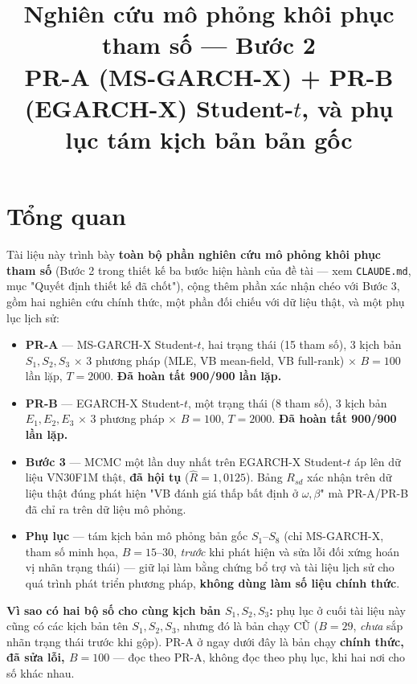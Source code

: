 \documentclass[11pt,a4paper]{article}
\title{\vspace{-1.2cm}\textbf{Nghiên cứu mô phỏng khôi phục tham số --- Bước 2}\\[0.25em]
\large PR-A (MS-GARCH-X) + PR-B (EGARCH-X) Student-$t$, và phụ lục tám kịch bản bản gốc}
\author{}
\date{}
\begin{document}
\maketitle
\vspace{-1.4cm}

\section*{Tổng quan}
Tài liệu này trình bày \textbf{toàn bộ phần nghiên cứu mô phỏng khôi phục tham số}
(Bước 2 trong thiết kế ba bước hiện hành của đề tài --- xem \texttt{CLAUDE.md},
mục "Quyết định thiết kế đã chốt"), cộng thêm phần xác nhận chéo với Bước 3,
gồm hai nghiên cứu chính thức, một phần đối chiếu với dữ liệu thật, và một phụ
lục lịch sử:

\begin{itemize}
\item \textbf{PR-A} --- MS-GARCH-X Student-$t$, hai trạng thái (15 tham số),
  3 kịch bản $S_1,S_2,S_3$ $\times$ 3 phương pháp (MLE, VB mean-field, VB
  full-rank) $\times$ $B=100$ lần lặp, $T=2000$. \textbf{Đã hoàn tất 900/900
  lần lặp.}
\item \textbf{PR-B} --- EGARCH-X Student-$t$, một trạng thái (8 tham số),
  3 kịch bản $E_1,E_2,E_3$ $\times$ 3 phương pháp $\times$ $B=100$, $T=2000$.
  \textbf{Đã hoàn tất 900/900 lần lặp.}
\item \textbf{Bước 3} --- MCMC một lần duy nhất trên EGARCH-X Student-$t$ áp
  lên dữ liệu VN30F1M thật, \textbf{đã hội tụ} ($\hat R=1{,}0125$). Bảng
  $R_{sd}$ xác nhận trên dữ liệu thật đúng phát hiện "VB đánh giá thấp bất
  định ở $\omega,\beta$" mà PR-A/PR-B đã chỉ ra trên dữ liệu mô phỏng.
\item \textbf{Phụ lục} --- tám kịch bản mô phỏng bản gốc $S_1$--$S_8$ (chỉ
  MS-GARCH-X, tham số minh họa, $B=15$--$30$, \emph{trước} khi phát hiện và sửa
  lỗi đối xứng hoán vị nhãn trạng thái) --- giữ lại làm bằng chứng bổ trợ và tài
  liệu lịch sử cho quá trình phát triển phương pháp, \textbf{không dùng làm số
  liệu chính thức}.
\end{itemize}

\textbf{Vì sao có hai bộ số cho cùng kịch bản $S_1,S_2,S_3$:} phụ lục ở cuối tài
liệu này cũng có các kịch bản tên $S_1,S_2,S_3$, nhưng đó là bản chạy CŨ ($B=29$,
\emph{chưa} sắp nhãn trạng thái trước khi gộp). PR-A ở ngay dưới đây là bản chạy
\textbf{chính thức, đã sửa lỗi, $B=100$} --- đọc theo PR-A, không đọc theo phụ lục,
khi hai nơi cho số khác nhau.
\end{document}

